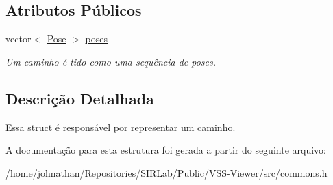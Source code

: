 \subsection*{Atributos Públicos}
\begin{DoxyCompactItemize}
\item 
vector$<$ \hyperlink{structcommon_1_1Pose}{Pose} $>$ \hyperlink{structcommon_1_1Path_ad6561127227344b7c0a24c04dc05cbd4}{poses}\hypertarget{structcommon_1_1Path_ad6561127227344b7c0a24c04dc05cbd4}{}\label{structcommon_1_1Path_ad6561127227344b7c0a24c04dc05cbd4}

\begin{DoxyCompactList}\small\item\em Um caminho é tido como uma sequência de poses. \end{DoxyCompactList}\end{DoxyCompactItemize}


\subsection{Descrição Detalhada}
Essa struct é responsável por representar um caminho. 

A documentação para esta estrutura foi gerada a partir do seguinte arquivo\+:\begin{DoxyCompactItemize}
\item 
/home/johnathan/\+Repositories/\+S\+I\+R\+Lab/\+Public/\+V\+S\+S-\/\+Viewer/src/commons.\+h\end{DoxyCompactItemize}
